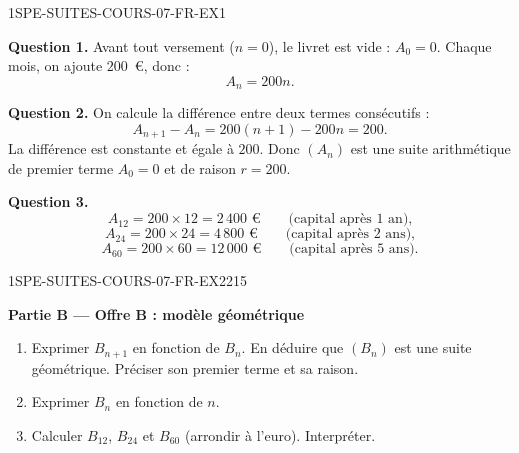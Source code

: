 \begin{corrige}{1SPE-SUITES-COURS-07-FR-EX1}


\textbf{Question 1.} Avant tout versement ($n = 0$), le livret est vide : $A_0 = 0$. Chaque mois, on ajoute $200$~€, donc :
\[
  A_n = 200n.
\]

\textbf{Question 2.} On calcule la différence entre deux termes consécutifs :
\[
  A_{n+1} - A_n = 200(n+1) - 200n = 200.
\]
La différence est constante et égale à $200$. Donc $(A_n)$ est une suite arithmétique de premier terme $A_0 = 0$ et de raison $r = 200$.

\textbf{Question 3.}
\[
  A_{12} = 200 \times 12 = 2\,400 \text{ €} \qquad \text{(capital après 1 an),}
\]
\[
  A_{24} = 200 \times 24 = 4\,800 \text{ €} \qquad \text{(capital après 2 ans),}
\]
\[
  A_{60} = 200 \times 60 = 12\,000 \text{ €} \qquad \text{(capital après 5 ans).}
\]

\end{corrige}

\bigskip


\begin{exercice}{1SPE-SUITES-COURS-07-FR-EX2}{2}{15}

\textbf{Partie B — Offre B : modèle géométrique}

\begin{enumerate}
  \item Exprimer $B_{n+1}$ en fonction de $B_n$. En déduire que $(B_n)$ est une suite géométrique. Préciser son premier terme et sa raison.
  \item Exprimer $B_n$ en fonction de $n$.
  \item Calculer $B_{12}$, $B_{24}$ et $B_{60}$ (arrondir à l'euro). Interpréter.
\end{enumerate}

\end{exercice}

